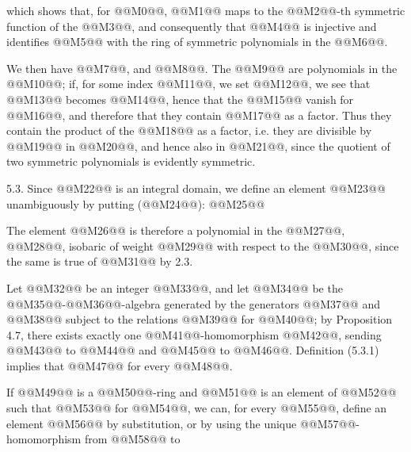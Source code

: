 which shows that, for @@M0@@, @@M1@@ maps to the @@M2@@-th symmetric function of the @@M3@@, and consequently that @@M4@@ is injective and identifies @@M5@@ with the ring of symmetric polynomials in the @@M6@@.

We then have @@M7@@, and @@M8@@. The @@M9@@ are polynomials in the @@M10@@; if, for some index @@M11@@, we set @@M12@@, we see that @@M13@@ becomes @@M14@@, hence that the @@M15@@ vanish for @@M16@@, and therefore that they contain @@M17@@ as a factor. Thus they contain the product of the @@M18@@ as a factor, i.e. they are divisible by @@M19@@ in @@M20@@, and hence also in @@M21@@, since the quotient of two symmetric polynomials is evidently symmetric.

5.3. Since @@M22@@ is an integral domain, we define an element @@M23@@ unambiguously by putting (@@M24@@):
@@M25@@

The element @@M26@@ is therefore a polynomial in the @@M27@@, @@M28@@, isobaric of weight @@M29@@ with respect to the @@M30@@, since the same is true of @@M31@@ by 2.3.

Let @@M32@@ be an integer @@M33@@, and let @@M34@@ be the @@M35@@-@@M36@@-algebra generated by the generators @@M37@@ and @@M38@@ subject to the relations @@M39@@ for @@M40@@; by Proposition 4.7, there exists exactly one @@M41@@-homomorphism @@M42@@, sending @@M43@@ to @@M44@@ and @@M45@@ to @@M46@@. Definition (5.3.1) implies that @@M47@@ for every @@M48@@.

If @@M49@@ is a @@M50@@-ring and @@M51@@ is an element of @@M52@@ such that @@M53@@ for @@M54@@, we can, for every @@M55@@, define an element @@M56@@ by substitution, or by using the unique @@M57@@-homomorphism from @@M58@@ to

